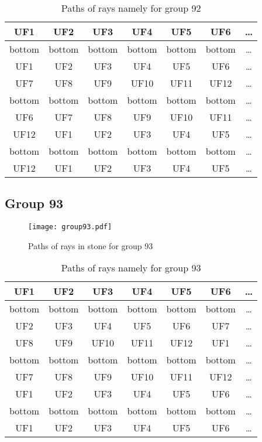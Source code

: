 \begin{table}[h!]
\centering
\begin{tabular}{|c|c|c|c|c|c|c|}
\hline
UF1 & UF2 & UF3 & UF4 & UF5 & UF6 & \dots \\
\hline
bottom & bottom & bottom & bottom & bottom & bottom & \dots \\
\hline
UF1 & UF2 & UF3 & UF4 & UF5 & UF6 & \dots \\
\hline
UF7 & UF8 & UF9 & UF10 & UF11 & UF12 & \dots \\
\hline
bottom & bottom & bottom & bottom & bottom & bottom & \dots \\
\hline
UF6 & UF7 & UF8 & UF9 & UF10 & UF11 & \dots \\
\hline
UF12 & UF1 & UF2 & UF3 & UF4 & UF5 & \dots \\
\hline
bottom & bottom & bottom & bottom & bottom & bottom & \dots \\
\hline
UF12 & UF1 & UF2 & UF3 & UF4 & UF5 & \dots \\
\hline
\end{tabular}
\caption{Paths of rays namely for group 92}
\label{table:TableGroup92}
\end{table}
\newpage
\subsection*{Group 93}






\begin{figure}[h!]
\centering
\texttt{[image: group93.pdf]}
\caption{Paths of rays in stone for group 93}
\label{table:FigGroup93}
\end{figure}



\begin{table}[h!]
\centering
\begin{tabular}{|c|c|c|c|c|c|c|}
\hline
UF1 & UF2 & UF3 & UF4 & UF5 & UF6 & \dots \\
\hline
bottom & bottom & bottom & bottom & bottom & bottom & \dots \\
\hline
UF2 & UF3 & UF4 & UF5 & UF6 & UF7 & \dots \\
\hline
UF8 & UF9 & UF10 & UF11 & UF12 & UF1 & \dots \\
\hline
bottom & bottom & bottom & bottom & bottom & bottom & \dots \\
\hline
UF7 & UF8 & UF9 & UF10 & UF11 & UF12 & \dots \\
\hline
UF1 & UF2 & UF3 & UF4 & UF5 & UF6 & \dots \\
\hline
bottom & bottom & bottom & bottom & bottom & bottom & \dots \\
\hline
UF1 & UF2 & UF3 & UF4 & UF5 & UF6 & \dots \\
\hline
\end{tabular}
\caption{Paths of rays namely for group 93}
\label{table:TableGroup93}
\end{table}
\newpage
